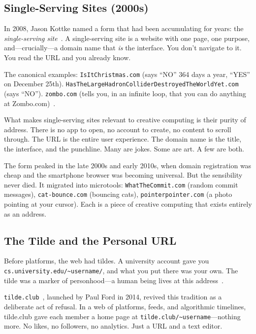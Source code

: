 \documentclass[10pt,letterpaper,twocolumn]{article}
\newcommand{\code}[1]{\texttt{#1}}
\begin{document}
\subsection{Single-Serving Sites (2000s)}

In 2008, Jason Kottke named a form that had been accumulating for years: the \emph{single-serving site}~\citep{kottke2008singleserving}. A single-serving site is a website with one page, one purpose, and---crucially---a domain name that \emph{is} the interface. You don't navigate to it. You read the URL and you already know.

The canonical examples: \code{IsItChristmas.com} (says ``NO'' 364 days a year, ``YES'' on December 25th). \code{HasTheLargeHadronCollider\-DestroyedTheWorldYet.com} (says ``NO''). \code{zombo.com} (tells you, in an infinite loop, that you can do anything at Zombo.com)~\citep{zombocom1999}.

What makes single-serving sites relevant to creative computing is their purity of address. There is no app to open, no account to create, no content to scroll through. The URL is the entire user experience. The domain name is the title, the interface, and the punchline. Many are jokes. Some are art. A few are both.

The form peaked in the late 2000s and early 2010s, when domain registration was cheap and the smartphone browser was becoming universal. But the sensibility never died. It migrated into microtools: \code{WhatTheCommit.com} (random commit messages), \code{cat-bounce.com} (bouncing cats), \code{pointerpointer.com} (a photo pointing at your cursor). Each is a piece of creative computing that exists entirely as an address.

\subsection{The Tilde and the Personal URL}

Before platforms, the web had tildes. A university account gave you \code{cs.university.edu/\textasciitilde{}username/}, and what you put there was your own. The tilde was a marker of personhood---a human being lives at this address~\citep{dirksen2014tilde}.

\code{tilde.club}~\citep{ford2014tildeclub}, launched by Paul Ford in 2014, revived this tradition as a deliberate act of refusal. In a web of platforms, feeds, and algorithmic timelines, tilde.club gave each member a home page at \code{tilde.club/\textasciitilde{}username}---nothing more. No likes, no followers, no analytics. Just a URL and a text editor.
\end{document}
